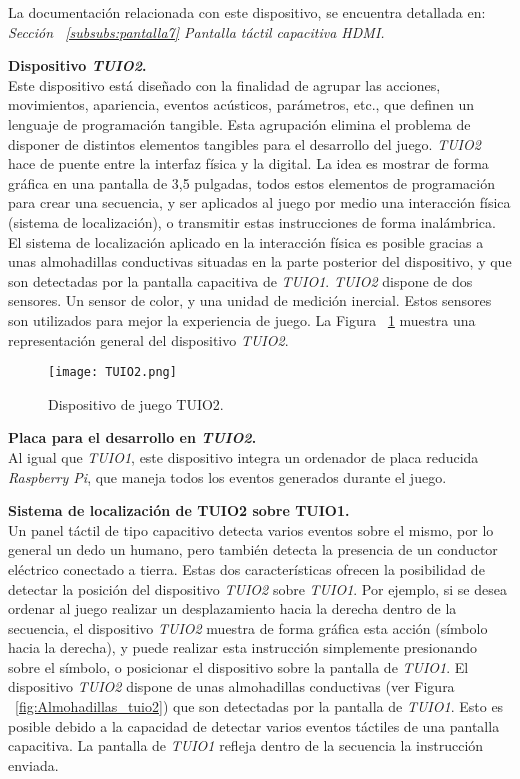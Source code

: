 La documentación relacionada con este dispositivo, se encuentra detallada en: \emph{Sección ~\ref{subsubs:pantalla7} Pantalla táctil capacitiva HDMI.}

\textbf{Dispositivo \emph{TUIO2}.}\\
Este dispositivo está diseñado con la finalidad de agrupar las acciones, movimientos, apariencia, eventos acústicos, parámetros, etc., que definen un lenguaje de programación tangible. Esta agrupación elimina el problema de disponer de distintos elementos tangibles para el desarrollo del juego. \emph{TUIO2} hace de puente entre la interfaz física y la digital.
La idea es mostrar de forma gráfica en una pantalla de 3,5 pulgadas, todos estos elementos de programación para crear una secuencia, y ser aplicados al juego por medio una interacción física (sistema de localización), o transmitir estas instrucciones de forma inalámbrica. El sistema de localización aplicado en la interacción física es posible gracias a unas almohadillas conductivas situadas en la parte posterior del dispositivo, y que son detectadas por la pantalla capacitiva de \emph{TUIO1}.
\emph{TUIO2} dispone de dos sensores. Un sensor de color, y una unidad de medición inercial. Estos sensores son utilizados para mejor la experiencia de juego.
La Figura ~\ref{fig:TUIO2} muestra una representación general del dispositivo \emph{TUIO2}.

\begin{figure}[!h]
\begin{center}
\texttt{[image: TUIO2.png]}
\caption{Dispositivo de juego TUIO2.}
\label{fig:TUIO2}
\end{center}
\end{figure}


\textbf{Placa para el desarrollo en \emph{TUIO2}.}\\
Al igual que \emph{TUIO1}, este dispositivo integra un ordenador de placa reducida \emph{Raspberry Pi}, que maneja todos los eventos generados durante el juego.


\textbf{Sistema de localización de TUIO2 sobre TUIO1.}\\
Un panel táctil de tipo capacitivo detecta varios eventos sobre el mismo, por lo general un dedo un humano, pero también detecta la presencia de un conductor eléctrico conectado a tierra. Estas dos características ofrecen la posibilidad de detectar la posición del dispositivo \emph{TUIO2} sobre \emph{TUIO1}.
Por ejemplo, si se desea ordenar al juego realizar un desplazamiento hacia la derecha dentro de la secuencia, el dispositivo \emph{TUIO2} muestra de forma gráfica esta acción (símbolo hacia la derecha), y puede realizar esta instrucción simplemente presionando sobre el símbolo, o posicionar el dispositivo sobre la pantalla de \emph{TUIO1}. El dispositivo \emph{TUIO2} dispone de unas almohadillas conductivas (ver Figura ~\ref{fig:Almohadillas_tuio2}) que son detectadas por la pantalla de \emph{TUIO1}. Esto es posible debido a la capacidad de detectar varios eventos táctiles de una pantalla capacitiva. La pantalla de \emph{TUIO1} refleja dentro de la secuencia la instrucción enviada.  


